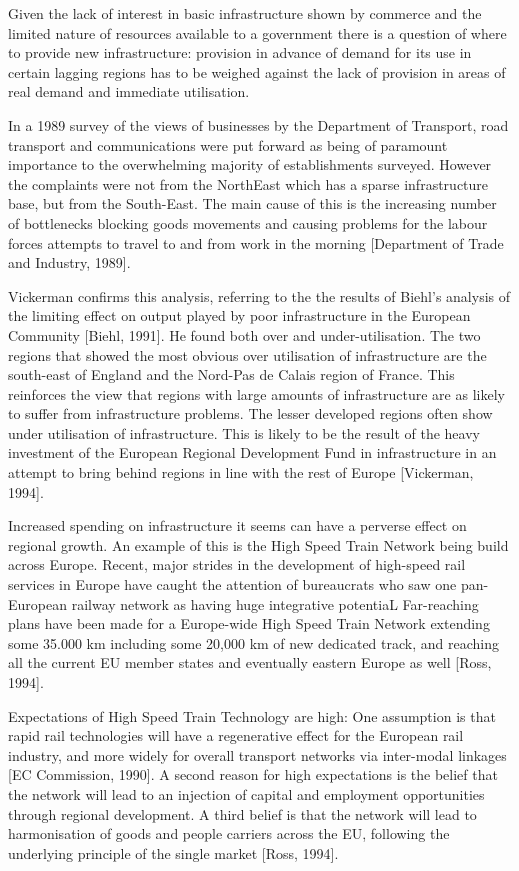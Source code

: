 Given the lack of interest in basic infrastructure shown by commerce and the limited nature of resources available to a government there is a question of where to provide new infrastructure: provision in advance of demand for its use in certain lagging regions has to be weighed against the lack of provision in areas of real demand and immediate utilisation.

In a 1989 survey of the views of businesses by the Department of Transport, road transport and communications were put forward as being of paramount importance to the overwhelming majority of establishments surveyed. However the complaints were not from the NorthEast which has a sparse infrastructure base, but from the South-East. The main cause of this is the increasing number of bottlenecks blocking goods movements and causing problems for the labour forces attempts to travel to and from work in the morning [Department of Trade and Industry, 1989].

Vickerman confirms this analysis, referring to the the results of Biehl's analysis of the limiting effect on output played by poor infrastructure in the European Community [Biehl, 1991]. He found both over and under-utilisation. The two regions that showed the most obvious over utilisation of infrastructure are the south-east of England and the Nord-Pas de Calais region of France. This reinforces the view that regions with large amounts of infrastructure are as likely to suffer from infrastructure problems. The lesser developed regions often show under utilisation of infrastructure. This is likely to be the result of the heavy investment of the European Regional Development Fund in infrastructure in an attempt to bring behind regions in line with the rest of Europe [Vickerman, 1994].

Increased spending on infrastructure it seems can have a perverse effect on regional growth. An example of this is the High Speed Train Network being build across Europe. Recent, major strides in the development of high-speed rail services in Europe have caught the attention of bureaucrats who saw one pan-European railway network as having huge integrative potentiaL Far-reaching plans have been made for a Europe-wide High Speed Train Network extending some 35.000 km including some 20,000 km of new dedicated track, and reaching all the current EU member states and eventually eastern Europe as well [Ross, 1994].

Expectations of High Speed Train Technology are high: One assumption is that rapid rail technologies will have a regenerative effect for the European rail industry, and more widely for overall transport networks via inter-modal linkages [EC Commission, 1990]. A second reason for high expectations is the belief that the network will lead to an injection of capital and employment opportunities through regional development. A third belief is that the network will lead to harmonisation of goods and people carriers across the EU, following the underlying principle of the single market [Ross, 1994].

